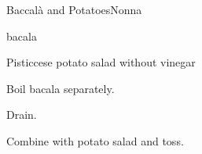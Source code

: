 \begin{recipe}{Baccal\`a and Potatoes}{Nonna}{}

\begin{ingredients}
\item bacala
\item Pisticcese potato salad without vinegar
\end{ingredients}

\begin{directions}
\item Boil bacala separately.
\item Drain.
\item Combine with potato salad and toss.
\end{directions}

\end{recipe}

